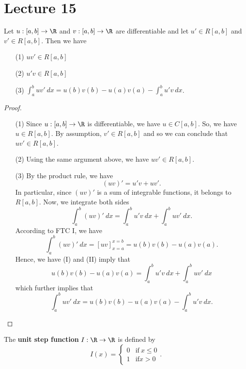 \section{Lecture 15}

\begin{theorem}
    Let \( u : [a,b] \to \R  \) and \( v : [a,b] \to \R  \) are differentiable and let \( u' \in R[a,b] \) and \( v' \in R[a,b] \). Then we have  
    \begin{enumerate}
        \item[(1)] \( uv' \in R [a,b] \)
        \item[(2)] \( u' v \in R[a,b] \)
        \item[(3)] \( \displaystyle  \int_{ a }^{ b }  uv'  \ dx = u(b)v(b) - u(a) v(a) - \displaystyle \int_{ a }^{ b } u' v  \ dx  \).
    \end{enumerate}
\end{theorem}

\begin{proof}
\begin{enumerate}
    \item[(1)] Since \( u:[a,b] \to \R  \) is differentiable, we have \( u \in C[a,b] \). So, we have \( u \in R[a,b] \). By assumption, \( v' \in R[a,b] \) and so we can conclude that \( uv' \in R[a,b] \).
    \item[(2)] Using the same argument above, we have \( uv' \in R[a,b] \).
    \item[(3)] By the product rule, we have 
        \[  (uv)' = u' v + u v'. \]
        In particular, since \( (uv)' \) is a sum of integrable functions, it belongs to \( R[a,b] \). Now, we integrate both sides 
        \[  \int_{ a }^{ b }  (uv)'   \ dx = \int_{ a }^{ b } u'v \ dx + \int_{ a }^{ b }  uv' \ dx. \tag{I} \]
        According to FTC I, we have
        \[  \int_{ a }^{ b } (uv)'  \ dx = [uv]_{x = a}^{x =b} = u(b)v(b) - u(a)v(a). \tag{II} \]
        Hence, we have (I) and (II) imply that
        \[  u(b)v(b) - u(a)v(a) = \int_{ a }^{ b } u'v \ dx + \int_{ a }^{ b }  u v' \ dx \]
        which further implies that 
        \[  \int_{ a }^{ b } uv' \ dx = u(b)v(b) - u(a)v(a) - \int_{ a }^{ b } u'v \ dx. \]
\end{enumerate}
\end{proof}

\begin{definition}
    The \textbf{unit step function} \( I: \R \to \R  \) is defined by
    \[  I(x) = 
    \begin{cases}
        0 &\text{if} \ x \leq 0 \\
        1 &\text{if} x > 0 
    \end{cases}. \]
\end{definition}

